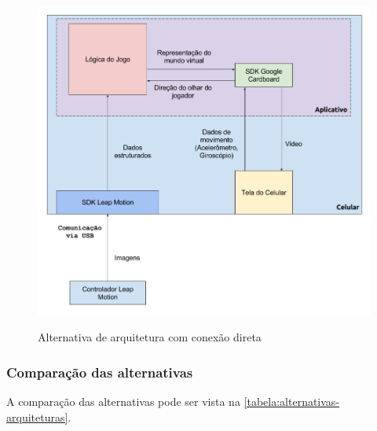 \begin{figure}
	\centering
	\caption{Alternativa de arquitetura com conexão direta}
	\includegraphics[width=0.7\linewidth]{images/Arquitetura-leap-android}
	\legend{\fonteAP}
	\label{fig:arquitetura-leap-android}
\end{figure}

\subsubsection{Comparação das alternativas}\label{subsubsec-arquiteturas-comparacao}

A comparação das alternativas pode ser vista na \autoref{tabela:alternativas-arquiteturas}.

